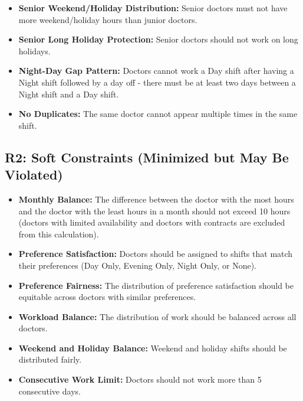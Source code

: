 \documentclass[12pt]{article}
\begin{document}
\begin{itemize}
    \item \textbf{Senior Weekend/Holiday Distribution:} Senior doctors must not have more weekend/holiday hours than junior doctors.
    
    \item \textbf{Senior Long Holiday Protection:} Senior doctors should not work on long holidays.
    
    \item \textbf{Night-Day Gap Pattern:} Doctors cannot work a Day shift after having a Night shift followed by a day off - there must be at least two days between a Night shift and a Day shift.
    
    \item \textbf{No Duplicates:} The same doctor cannot appear multiple times in the same shift.
\end{itemize}

\subsection*{R2: Soft Constraints (Minimized but May Be Violated)}

\begin{itemize}
    \item \textbf{Monthly Balance:} The difference between the doctor with the most hours and the doctor with the least hours in a month should not exceed 10 hours (doctors with limited availability and doctors with contracts are excluded from this calculation).
    
    \item \textbf{Preference Satisfaction:} Doctors should be assigned to shifts that match their preferences (Day Only, Evening Only, Night Only, or None).
    
    \item \textbf{Preference Fairness:} The distribution of preference satisfaction should be equitable across doctors with similar preferences.
    
    \item \textbf{Workload Balance:} The distribution of work should be balanced across all doctors.
    
    \item \textbf{Weekend and Holiday Balance:} Weekend and holiday shifts should be distributed fairly.
    
    \item \textbf{Consecutive Work Limit:} Doctors should not work more than 5 consecutive days.
\end{itemize}
\end{document}
